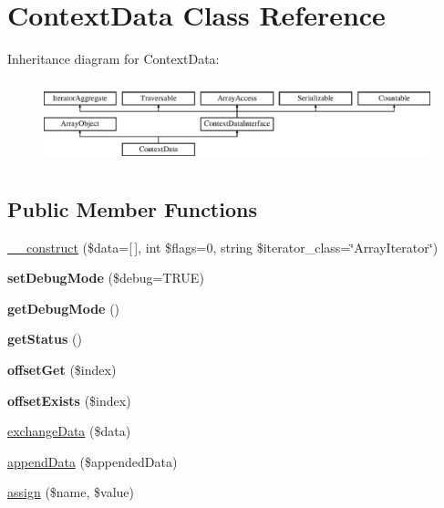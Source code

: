 \hypertarget{class_pes_1_1_type_1_1_context_data}{}\section{Context\+Data Class Reference}
\label{class_pes_1_1_type_1_1_context_data}
Inheritance diagram for Context\+Data\+:\begin{figure}[H]
\begin{center}
\leavevmode
\includegraphics[height=2.434783cm]{class_pes_1_1_type_1_1_context_data}
\end{center}
\end{figure}
\subsection*{Public Member Functions}
\begin{DoxyCompactItemize}
\item 
\mbox{\hyperlink{class_pes_1_1_type_1_1_context_data_af245ccb689c09fbd2417c386097c1193}{\+\_\+\+\_\+construct}} (\$data=\textquotesingle{}\mbox{[}$\,$\mbox{]}\textquotesingle{}, int \$flags=0, string \$iterator\+\_\+class=\char`\"{}Array\+Iterator\char`\"{})
\item 
\mbox{\label{class_pes_1_1_type_1_1_context_data_a411368c841a995d2d98464ce2ed215b2}} 
{\bfseries set\+Debug\+Mode} (\$debug=T\+R\+UE)
\item 
\mbox{\label{class_pes_1_1_type_1_1_context_data_aef403af504f818f9acbff3caaa01cf69}} 
{\bfseries get\+Debug\+Mode} ()
\item 
\mbox{\label{class_pes_1_1_type_1_1_context_data_a9d21636071f529e2154051d3ea6e5921}} 
{\bfseries get\+Status} ()
\item 
\mbox{\label{class_pes_1_1_type_1_1_context_data_a904276455f8372c310439fc95558cb4a}} 
{\bfseries offset\+Get} (\$index)
\item 
\mbox{\label{class_pes_1_1_type_1_1_context_data_a4a4d308ef2acb64c0063912cdb0d868b}} 
{\bfseries offset\+Exists} (\$index)
\item 
\mbox{\hyperlink{class_pes_1_1_type_1_1_context_data_abdec3ea9fb5d4719d665c630123e59fc}{exchange\+Data}} (\$data)
\item 
\mbox{\hyperlink{class_pes_1_1_type_1_1_context_data_a9ca70df7ea476fc99e323dd024495ddc}{append\+Data}} (\$appended\+Data)
\item 
\mbox{\hyperlink{class_pes_1_1_type_1_1_context_data_ac151b5fc880911b525ed71fd25806f62}{assign}} (\$name, \$value)
\end{DoxyCompactItemize}
